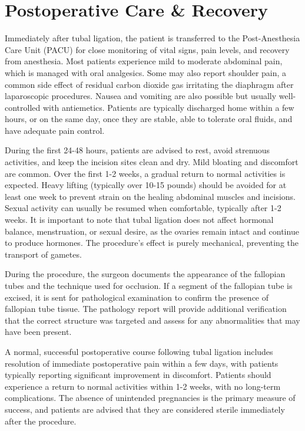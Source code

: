 \section*{Postoperative Care \& Recovery}
Immediately after tubal ligation, the patient is transferred to the Post-Anesthesia Care Unit (PACU) for close monitoring of vital signs, pain levels, and recovery from anesthesia. Most patients experience mild to moderate abdominal pain, which is managed with oral analgesics. Some may also report shoulder pain, a common side effect of residual carbon dioxide gas irritating the diaphragm after laparoscopic procedures. Nausea and vomiting are also possible but usually well-controlled with antiemetics. Patients are typically discharged home within a few hours, or on the same day, once they are stable, able to tolerate oral fluids, and have adequate pain control.

During the first 24-48 hours, patients are advised to rest, avoid strenuous activities, and keep the incision sites clean and dry. Mild bloating and discomfort are common. Over the first 1-2 weeks, a gradual return to normal activities is expected. Heavy lifting (typically over 10-15 pounds) should be avoided for at least one week to prevent strain on the healing abdominal muscles and incisions. Sexual activity can usually be resumed when comfortable, typically after 1-2 weeks. It is important to note that tubal ligation does not affect hormonal balance, menstruation, or sexual desire, as the ovaries remain intact and continue to produce hormones. The procedure's effect is purely mechanical, preventing the transport of gametes.

During the procedure, the surgeon documents the appearance of the fallopian tubes and the technique used for occlusion. If a segment of the fallopian tube is excised, it is sent for pathological examination to confirm the presence of fallopian tube tissue. The pathology report will provide additional verification that the correct structure was targeted and assess for any abnormalities that may have been present.

A normal, successful postoperative course following tubal ligation includes resolution of immediate postoperative pain within a few days, with patients typically reporting significant improvement in discomfort. Patients should experience a return to normal activities within 1-2 weeks, with no long-term complications. The absence of unintended pregnancies is the primary measure of success, and patients are advised that they are considered sterile immediately after the procedure.

